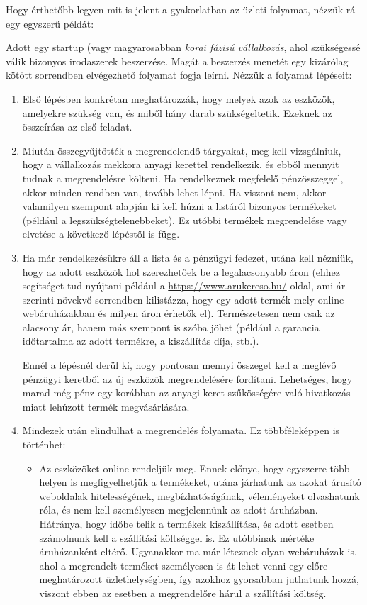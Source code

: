 Hogy érthetőbb legyen mit is jelent a gyakorlatban az üzleti folyamat, nézzük rá egy egyszerű példát:

Adott egy startup (vagy magyarosabban \textit{korai fázisú vállalkozás}\cite{wiki}, ahol szükségessé válik bizonyos irodaszerek beszerzése. Magát a beszerzés menetét egy kizárólag kötött sorrendben elvégezhető folyamat fogja leírni. Nézzük a folyamat lépéseit:

\begin{enumerate}
\item Első lépésben konkrétan meghatározzák, hogy melyek azok az eszközök, amelyekre szükség van, és miből hány darab szükségeltetik. Ezeknek az összeírása az első feladat.

\item Miután összegyűjtötték a megrendelendő tárgyakat, meg kell vizsgálniuk, hogy a vállalkozás mekkora anyagi kerettel rendelkezik, és ebből mennyit tudnak a megrendelésre költeni. Ha rendelkeznek megfelelő pénzösszeggel, akkor minden rendben van, tovább lehet lépni. Ha viszont nem, akkor valamilyen szempont alapján ki kell húzni a listáról bizonyos termékeket (például a legszükségtelenebbeket). Ez utóbbi termékek megrendelése vagy elvetése a következő lépéstől is függ.

\item Ha már rendelkezésükre áll a lista és a pénzügyi fedezet, utána kell nézniük, hogy az adott eszközök hol szerezhetőek be a legalacsonyabb áron (ehhez segítséget tud nyújtani például a \url{https://www.arukereso.hu/} oldal, ami ár szerinti növekvő sorrendben kilistázza, hogy egy adott termék mely online webáruházakban és milyen áron érhetők el). Természetesen nem csak az alacsony ár, hanem más szempont is szóba jöhet (például a garancia időtartalma az adott termékre, a kiszállítás díja, stb.).

Ennél a lépésnél derül ki, hogy pontosan mennyi összeget kell a meglévő pénzügyi keretből az új eszközök megrendelésére fordítani. Lehetséges, hogy marad még pénz egy korábban az anyagi keret szűkösségére való hivatkozás miatt lehúzott termék megvásárlására.

\item Mindezek után elindulhat a megrendelés folyamata. Ez többféleképpen is történhet:

\begin{itemize}
\item Az eszközöket online rendeljük meg. Ennek előnye, hogy egyszerre több helyen is megfigyelhetjük a termékeket, utána járhatunk az azokat árusító weboldalak hitelességének, megbízhatóságának, véleményeket olvashatunk róla, és nem kell személyesen megjelennünk az adott áruházban. Hátránya, hogy időbe telik a termékek kiszállítása, és adott esetben számolnunk kell a szállítási költséggel is. Ez utóbbinak mértéke áruházanként eltérő. Ugyanakkor ma már léteznek olyan webáruházak is, ahol a megrendelt terméket személyesen is át lehet venni egy előre meghatározott üzlethelységben, így azokhoz gyorsabban juthatunk hozzá, viszont ebben az esetben a megrendelőre hárul a szállítási költség.


\end{itemize}
\end{enumerate}
